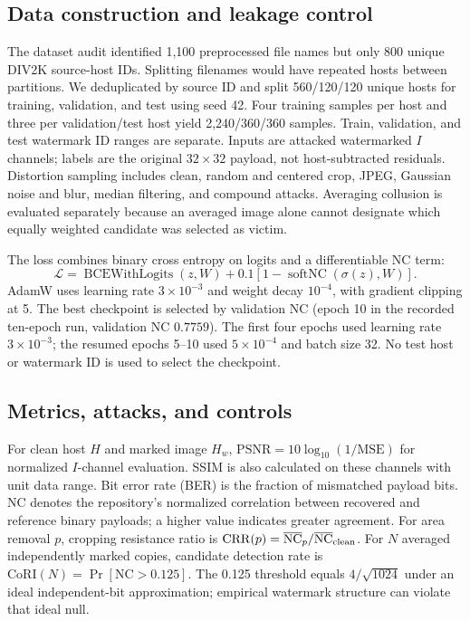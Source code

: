 \documentclass[conference]{IEEEtran}
\begin{document}
\subsection{Data construction and leakage control}
The dataset audit identified 1,100 preprocessed file names but only 800 unique DIV2K source-host IDs. Splitting filenames would have repeated hosts between partitions. We deduplicated by source ID and split 560/120/120 unique hosts for training, validation, and test using seed 42. Four training samples per host and three per validation/test host yield 2,240/360/360 samples. Train, validation, and test watermark ID ranges are separate. Inputs are attacked watermarked $I$ channels; labels are the original $32\times32$ payload, not host-subtracted residuals. Distortion sampling includes clean, random and centered crop, JPEG, Gaussian noise and blur, median filtering, and compound attacks. Averaging collusion is evaluated separately because an averaged image alone cannot designate which equally weighted candidate was selected as victim.

The loss combines binary cross entropy on logits and a differentiable NC term:
\begin{equation}\mathcal L=\operatorname{BCEWithLogits}(z,W)+0.1[1-\operatorname{softNC}(\sigma(z),W)].\end{equation}
AdamW uses learning rate $3\times10^{-3}$ and weight decay $10^{-4}$, with gradient clipping at 5. The best checkpoint is selected by validation NC (epoch 10 in the recorded ten-epoch run, validation NC $0.7759$). The first four epochs used learning rate $3\times10^{-3}$; the resumed epochs 5--10 used $5\times10^{-4}$ and batch size 32. No test host or watermark ID is used to select the checkpoint.

\subsection{Metrics, attacks, and controls}
For clean host $H$ and marked image $H_w$, $\mathrm{PSNR}=10\log_{10}(1/\mathrm{MSE})$ for normalized $I$-channel evaluation. SSIM is also calculated on these channels with unit data range. Bit error rate (BER) is the fraction of mismatched payload bits. NC denotes the repository's normalized correlation between recovered and reference binary payloads; a higher value indicates greater agreement. For area removal $p$, cropping resistance ratio is $\mathrm{CRR}(p)=\overline{\mathrm{NC}}_p/\overline{\mathrm{NC}}_{\rm clean}$. For $N$ averaged independently marked copies, candidate detection rate is $\mathrm{CoRI}(N)=\Pr[\mathrm{NC}>0.125]$. The 0.125 threshold equals $4/\sqrt{1024}$ under an ideal independent-bit approximation; empirical watermark structure can violate that ideal null.
\end{document}
